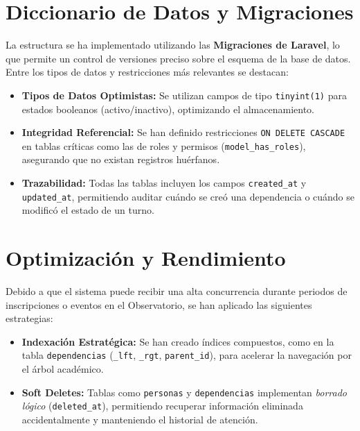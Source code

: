 \section{Diccionario de Datos y Migraciones}
La estructura se ha implementado utilizando las \textbf{Migraciones de Laravel}, lo que permite un control de versiones preciso sobre el esquema de la base de datos. Entre los tipos de datos y restricciones más relevantes se destacan:

\begin{itemize}
    \item \textbf{Tipos de Datos Optimistas:} Se utilizan campos de tipo \texttt{tinyint(1)} para estados booleanos (activo/inactivo), optimizando el almacenamiento.
    \item \textbf{Integridad Referencial:} Se han definido restricciones \texttt{ON DELETE CASCADE} en tablas críticas como las de roles y permisos (\texttt{model\_has\_roles}), asegurando que no existan registros huérfanos.
    \item \textbf{Trazabilidad:} Todas las tablas incluyen los campos \texttt{created\_at} y \texttt{updated\_at}, permitiendo auditar cuándo se creó una dependencia o cuándo se modificó el estado de un turno.
\end{itemize}

\section{Optimización y Rendimiento}
Debido a que el sistema puede recibir una alta concurrencia durante periodos de inscripciones o eventos en el Observatorio, se han aplicado las siguientes estrategias:

\begin{itemize}
    \item \textbf{Indexación Estratégica:} Se han creado índices compuestos, como en la tabla \texttt{dependencias} (\texttt{\_lft}, \texttt{\_rgt}, \texttt{parent\_id}), para acelerar la navegación por el árbol académico.
    \item \textbf{Soft Deletes:} Tablas como \texttt{personas} y \texttt{dependencias} implementan \textit{borrado lógico} (\texttt{deleted\_at}), permitiendo recuperar información eliminada accidentalmente y manteniendo el historial de atención.
\end{itemize}
